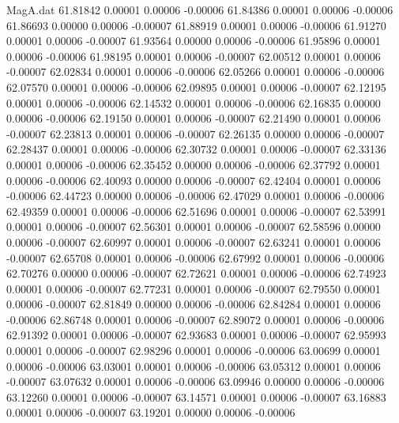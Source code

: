 \begin{filecontents}{MagA.dat}
  61.81842    0.00001    0.00006   -0.00006
  61.84386    0.00001    0.00006   -0.00006
  61.86693    0.00000    0.00006   -0.00007
  61.88919    0.00001    0.00006   -0.00006
  61.91270    0.00001    0.00006   -0.00007
  61.93564    0.00000    0.00006   -0.00006
  61.95896    0.00001    0.00006   -0.00006
  61.98195    0.00001    0.00006   -0.00007
  62.00512    0.00001    0.00006   -0.00007
  62.02834    0.00001    0.00006   -0.00006
  62.05266    0.00001    0.00006   -0.00006
  62.07570    0.00001    0.00006   -0.00006
  62.09895    0.00001    0.00006   -0.00007
  62.12195    0.00001    0.00006   -0.00006
  62.14532    0.00001    0.00006   -0.00006
  62.16835    0.00000    0.00006   -0.00006
  62.19150    0.00001    0.00006   -0.00007
  62.21490    0.00001    0.00006   -0.00007
  62.23813    0.00001    0.00006   -0.00007
  62.26135    0.00000    0.00006   -0.00007
  62.28437    0.00001    0.00006   -0.00006
  62.30732    0.00001    0.00006   -0.00007
  62.33136    0.00001    0.00006   -0.00006
  62.35452    0.00000    0.00006   -0.00006
  62.37792    0.00001    0.00006   -0.00006
  62.40093    0.00000    0.00006   -0.00007
  62.42404    0.00001    0.00006   -0.00006
  62.44723    0.00000    0.00006   -0.00006
  62.47029    0.00001    0.00006   -0.00006
  62.49359    0.00001    0.00006   -0.00006
  62.51696    0.00001    0.00006   -0.00007
  62.53991    0.00001    0.00006   -0.00007
  62.56301    0.00001    0.00006   -0.00007
  62.58596    0.00000    0.00006   -0.00007
  62.60997    0.00001    0.00006   -0.00007
  62.63241    0.00001    0.00006   -0.00007
  62.65708    0.00001    0.00006   -0.00006
  62.67992    0.00001    0.00006   -0.00006
  62.70276    0.00000    0.00006   -0.00007
  62.72621    0.00001    0.00006   -0.00006
  62.74923    0.00001    0.00006   -0.00007
  62.77231    0.00001    0.00006   -0.00007
  62.79550    0.00001    0.00006   -0.00007
  62.81849    0.00000    0.00006   -0.00006
  62.84284    0.00001    0.00006   -0.00006
  62.86748    0.00001    0.00006   -0.00007
  62.89072    0.00001    0.00006   -0.00006
  62.91392    0.00001    0.00006   -0.00007
  62.93683    0.00001    0.00006   -0.00007
  62.95993    0.00001    0.00006   -0.00007
  62.98296    0.00001    0.00006   -0.00006
  63.00699    0.00001    0.00006   -0.00006
  63.03001    0.00001    0.00006   -0.00006
  63.05312    0.00001    0.00006   -0.00007
  63.07632    0.00001    0.00006   -0.00006
  63.09946    0.00000    0.00006   -0.00006
  63.12260    0.00001    0.00006   -0.00007
  63.14571    0.00001    0.00006   -0.00007
  63.16883    0.00001    0.00006   -0.00007
  63.19201    0.00000    0.00006   -0.00006

\end{filecontents}
